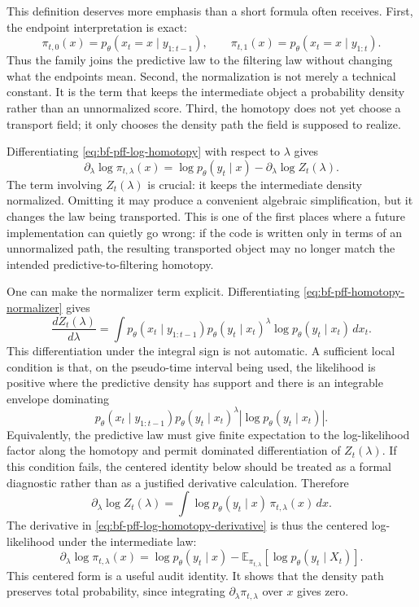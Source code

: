 This definition deserves more emphasis than a short formula often receives.
First, the endpoint interpretation is exact:
\[
  \pi_{t,0}(x) = p_\theta(x_t=x \mid y_{1:t-1}),
  \qquad
  \pi_{t,1}(x) = p_\theta(x_t=x \mid y_{1:t}).
\]
Thus the family joins the predictive law to the filtering law without changing
what the endpoints mean.  Second, the normalization is not merely a technical
constant.  It is the term that keeps the intermediate object a probability
density rather than an unnormalized score.  Third, the homotopy does not yet
choose a transport field; it only chooses the density path the field is supposed
to realize.

Differentiating \eqref{eq:bf-pff-log-homotopy} with respect to $\lambda$ gives
\begin{equation}
\label{eq:bf-pff-log-homotopy-derivative}
  \partial_\lambda \log \pi_{t,\lambda}(x)
  = \log p_\theta(y_t \mid x) - \partial_\lambda \log Z_t(\lambda).
\end{equation}
The term involving $Z_t(\lambda)$ is crucial: it keeps the intermediate density
normalized.  Omitting it may produce a convenient algebraic simplification, but
it changes the law being transported.  This is one of the first places where a
future implementation can quietly go wrong: if the code is written only in terms
of an unnormalized path, the resulting transported object may no longer match
the intended predictive-to-filtering homotopy.

One can make the normalizer term explicit.  Differentiating
\eqref{eq:bf-pff-homotopy-normalizer} gives
\[
  \frac{dZ_t(\lambda)}{d\lambda}
  =
  \int p_\theta(x_t \mid y_{1:t-1})
       p_\theta(y_t \mid x_t)^\lambda
       \log p_\theta(y_t \mid x_t)\,dx_t.
\]
This differentiation under the integral sign is not automatic.  A sufficient
local condition is that, on the pseudo-time interval being used, the likelihood
is positive where the predictive density has support and there is an integrable
envelope dominating
\[
  p_\theta(x_t\mid y_{1:t-1})
  p_\theta(y_t\mid x_t)^\lambda
  \left|\log p_\theta(y_t\mid x_t)\right|.
\]
Equivalently, the predictive law must give finite expectation to the
log-likelihood factor along the homotopy and permit dominated differentiation
of $Z_t(\lambda)$.  If this condition fails, the centered identity below should
be treated as a formal diagnostic rather than as a justified derivative
calculation.
Therefore
\[
  \partial_\lambda \log Z_t(\lambda)
  =
  \int \log p_\theta(y_t \mid x)\,
       \pi_{t,\lambda}(x)\,dx.
\]
The derivative in \eqref{eq:bf-pff-log-homotopy-derivative} is thus the
centered log-likelihood under the intermediate law:
\[
  \partial_\lambda \log \pi_{t,\lambda}(x)
  =
  \log p_\theta(y_t \mid x)
  -
  \mathbb E_{\pi_{t,\lambda}}
  [\log p_\theta(y_t \mid X_t)].
\]
This centered form is a useful audit identity.  It shows that the density path
preserves total probability, since integrating
$\partial_\lambda\pi_{t,\lambda}$ over $x$ gives zero.

